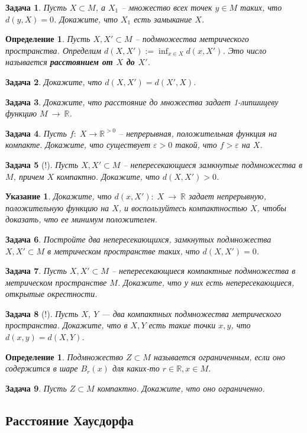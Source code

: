 \documentclass[12pt]{book}
\newcommand{\arrow}{{\:\longrightarrow\:}}
\renewcommand{\epsilon}{\varepsilon}
\def\R{{\mathbb R}}
\theoremstyle{upshape}
\newtheorem{zadacha}{Задача}[chapter]
\theoremstyle{generic}
\newtheorem{opredelenie}[teorema]{Определение}
\newtheorem{remark}[teorema]{Замечание}
\def\замечание{\begin{remark}}
\def\еза{\end{remark}}
\theoremstyle{upshapenonumber}
\newtheorem{ukazanie}{Указание}[section]
\newcommand{\следствие}{%
     \refstepcounter{teorema}
     {\noindent\bf Следствие \thechapter.\arabic{teorema}:\ }}
\newcommand{\пример}{%
     \refstepcounter{teorema}
     {\noindent\bf Пример \thechapter.\arabic{teorema}:\ }}
\newcommand{\лемма}{%
     \refstepcounter{teorema}
     {\noindent\bf Лемма \thechapter.\arabic{teorema}:\ }}
\newcommand{\теорема}{%
     \refstepcounter{teorema}
     {\noindent\bf Теорема \thechapter.\arabic{teorema}:\ }}
\newcommand{\утверждение}{%
     \refstepcounter{teorema}
     {\noindent\bf Утверждение \thechapter.\arabic{teorema}:\ }}
\def\бф{\bf}
\def\ем{\em}
\def\задача{\begin{zadacha}}
\def\ез{\end{zadacha}}
\def\указание{\begin{ukazanie}}
\def\еу{\end{ukazanie}}
\def\определение{\begin{opredelenie}}
\def\ео{\end{opredelenie}}
\def\енум{\begin{enumerate}}
\def\ее{\end{enumerate}}
\begin{document}
{\задача
Пусть $X\subset M$, а $X_1$ -- множество всех точек
$y\in M$ таких, что $d(y,X)=0$. Докажите, что
$X_1$ есть замыкание $X$.
\ез

 
\определение
Пусть $X,X'\subset M$ -- подмножества метрического
пространства. Определим $d(X, X'):= \inf_{x\in X}d(x,X')$.
Это число называется {\бф расстоянием от $X$ до $X'$}.
\ео

\задача
Докажите, что $d(X, X')=d(X', X)$.
\ез

\задача
Докажите, что расстояние до множества задает 
1-липшицеву функцию $M\arrow \R$.
\ез


\задача
Пусть $f:\; X \to \R^{>0}$ -- непрерывная, положительная функция
на компакте. Докажите, что существует $\epsilon >0$ такой,
что $f>\epsilon$ на $X$.
\ез

\задача[!]
Пусть $X,X'\subset M$ -- непересекающиеся замкнутые
подмножества в $M$, причем $X$ компактно.
Докажите, что $d(X,X')>0$.
\ез

\указание 
Докажите, что $d(x,X'):\; X \arrow \R$ задает непрерывную,
положительную функцию на $X$, и воспользуйтесь
компактностью $X$, чтобы доказать, что ее минимум положителен.
\еу

\задача
Постройте два непересекающихся, замкнутых подмножества 
$X,X'\subset M$ в метрическом пространстве таких, что
$d(X,X')=0$.
\ез

\задача
Пусть $X,X'\subset M$ -- непересекающиеся компактные
подмножества в метрическом пространстве $M$. Докажите, что
у них есть непересекающиеся, открытые окрестности.
\ез


\begin{zadacha}[!] Пусть $X$, $Y$ --- два компактных подмножества
метрического пространства. Докажите, что в $X, Y$ есть такие точки
$x, y$, что $d(x,y) = d(X,Y)$.
\end{zadacha}

\begin{opredelenie} Подмножество $Z\subset M$ называется
ограниченным, если оно содержится в шаре $B_r(x)$ для каких-то
$r\in\R, x\in M$.
\end{opredelenie}

\begin{zadacha} Пусть $Z\subset M$ компактно.
Докажите, что оно ограниченно.
\end{zadacha}


\subsection*{Расстояние Хаусдорфа}


}
\end{document}
